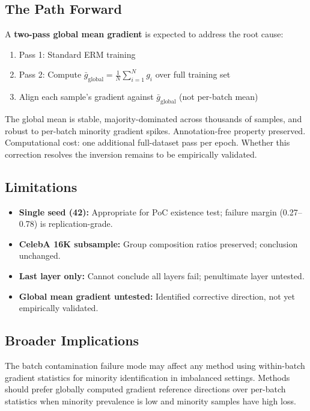 \subsection{The Path Forward}

A \textbf{two-pass global mean gradient} is expected to address the root cause:
\begin{enumerate}
  \item Pass 1: Standard ERM training
  \item Pass 2: Compute $\bar{g}_\text{global} = \frac{1}{N}\sum_{i=1}^N g_i$ over full training set
  \item Align each sample's gradient against $\bar{g}_\text{global}$ (not per-batch mean)
\end{enumerate}
The global mean is stable, majority-dominated across thousands of samples, and robust to per-batch minority gradient spikes.
Annotation-free property preserved.
Computational cost: one additional full-dataset pass per epoch.
Whether this correction resolves the inversion remains to be empirically validated.

\subsection{Limitations}

\begin{itemize}
  \item \textbf{Single seed (42):} Appropriate for PoC existence test; failure margin (0.27--0.78) is replication-grade.
  \item \textbf{CelebA 16K subsample:} Group composition ratios preserved; conclusion unchanged.
  \item \textbf{Last layer only:} Cannot conclude all layers fail; penultimate layer untested.
  \item \textbf{Global mean gradient untested:} Identified corrective direction, not yet empirically validated.
\end{itemize}

\subsection{Broader Implications}

The batch contamination failure mode may affect any method using within-batch gradient statistics for minority identification in imbalanced settings.
Methods should prefer globally computed gradient reference directions over per-batch statistics when minority prevalence is low and minority samples have high loss.
